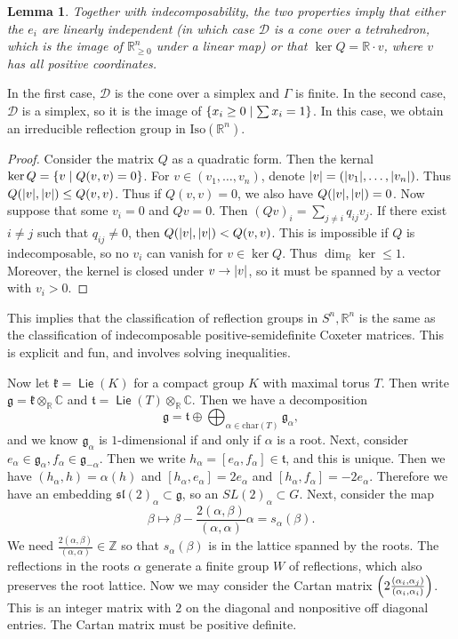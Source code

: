 \documentclass[leqno, openany]{memoir}
\newtheorem{lem}[thm]{Lemma}
\theoremstyle{definition}
\theoremstyle{remark}
\theoremstyle{plain}
\theoremstyle{definition}
\theoremstyle{remark}
\newcommand{\R}{\mathbb{R}}
\newcommand{\C}{\mathbb{C}}
\newcommand{\Z}{\mathbb{Z}}
\newcommand{\mc}[1]{\mathcal{#1}}
\newcommand{\mf}[1]{\mathfrak{#1}}
\newcommand{\mr}[1]{\mathrm{#1}}
\DeclareMathOperator{\Lie}{\mathsf{Lie}}
\begin{document}
\begin{lem}
    Together with indecomposability, the two properties imply that either the $e_i$ are linearly independent (in which case $\mc{D}$ is a cone over a tetrahedron, which is the image of $\R_{\geq 0}^n$ under a linear map) or that $\ker Q = \R \cdot v$, where $v$ has all positive coordinates.
\end{lem}

In the first case, $\mc{D}$ is the cone over a simplex and $\Gamma$ is finite. In the second case, $\mc{D}$ is a simplex, so it is the image of $\qty{x_i \geq 0 \mid \sum x_i = 1}$. In this case, we obtain an irreducible reflection group in $\mr{Iso}(\R^n)$.

\begin{proof}
    Consider the matrix $Q$ as a quadratic form. Then the kernal $\ker Q = \qty{v \mid Q(v,v) = 0}$. For $v \in (v_1, \ldots, v_n)$, denote $\abs{v} = (\abs{v_1}, \ldots, \abs{v_n})$. Thus $Q(\abs{v}, \abs{v}) \leq Q(v,v)$. Thus if $Q(v,v) = 0$, we also have $Q(\abs{v}, \abs{v}) = 0$. Now suppose that some $v_i = 0$ and $Qv = 0$. Then ${(Qv)}_i = \sum_{j \neq i} q_{ij} v_j$. If there exist $i \neq j$ such that $q_{ij} \neq 0$, then $Q(\abs{v}, \abs{v}) < Q(v,v)$. This is impossible if $Q$ is indecomposable, so no $v_i$ can vanish for $v \in \ker Q$. Thus $\dim_{\R} \ker \leq 1$. Moreover, the kernel is closed under $v \to \abs{v}$, so it must be spanned by a vector with $v_i > 0$.
\end{proof}

This implies that the classification of reflection groups in $S^n, \R^n$ is the same as the classification of indecomposable positive-semidefinite Coxeter matrices. This is explicit and fun, and involves solving inequalities. 

Now let $\mf{k} = \Lie(K)$ for a compact group $K$ with maximal torus $T$. Then write $\mf{g} = \mf{k} \otimes_{\R} \C$ and $\mf{t} = \Lie(T) \otimes_{\R} \C$. Then we have a decomposition 
\[ \mf{g} = \mf{t} \oplus \bigoplus_{\alpha \in \mr{char}(T)} \mf{g}_{\alpha}, \]
and we know $\mf{g}_{\alpha}$ is $1$-dimensional if and only if $\alpha$ is a root. Next, consider $e_{\alpha} \in \mf{g}_{\alpha}, f_{\alpha} \in \mf{g}_{-\alpha}$. Then we write $h_{\alpha} = [e_{\alpha}, f_{\alpha}] \in \mf{t}$, and this is unique. Then we have $(h_{\alpha}, h) = \alpha(h)$ and $[h_{\alpha}, e_{\alpha}] = 2 e_{\alpha}$ and $[h_{\alpha}, f_{\alpha}] = -2 e_{\alpha}$. Therefore we have an embedding ${\mf{sl}(2)}_{\alpha} \subset \mf{g}$, so an ${SL(2)}_{\alpha} \subset G$. Next, consider the map 
\[ \beta \mapsto \beta - \frac{2(\alpha, \beta)}{(\alpha, \alpha)} \alpha = s_{\alpha}(\beta). \] 
We need $\frac{2(\alpha,\beta)}{(\alpha, \alpha)} \in \Z$ so that $s_{\alpha}(\beta)$ is in the lattice spanned by the roots. The reflections in the roots $\alpha$ generate a finite group $W$ of reflections, which also preserves the root lattice. Now we may consider the Cartan matrix $\qty(2 \frac{(\alpha_i,\alpha_j)}{(\alpha_i, \alpha_i)})$. This is an integer matrix with $2$ on the diagonal and nonpositive off diagonal entries. The Cartan matrix must be positive definite.
\end{document}

